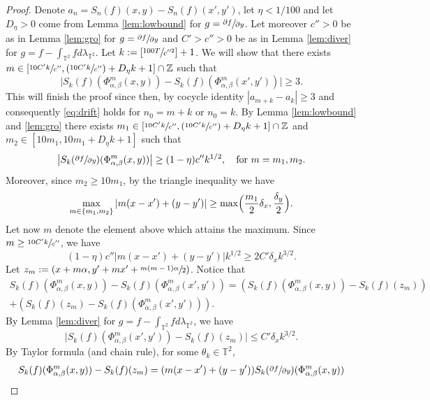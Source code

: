\documentclass[10pt]{amsart}
\newcommand{\Psfrac}[2]{(\sfrac{#1}{#2})}
\theoremstyle{definition}
\theoremstyle{plain}
\newcommand\TT{\mathbb{T}}
\newcommand\ZZ{\mathbb{Z}}
\begin{document}
\begin{proof} Denote $a_n=S_{n}(f)(x,y)-S_{n}(f)(x',y')$, let $\eta<1/100$ and let $D_\eta>0$ come from Lemma \ref{lem:lowbound} for $g=\sfrac{\partial f}{\partial y}$. Let moreover $c''>0$ be as in Lemma \ref{lem:gro} for $g=\sfrac{\partial f}{\partial y}$ and $C'>c'' >0$ be as in Lemma \ref{lem:diver} for $g=f-\int_{\TT^2} f d\lambda_{\TT^2}$.
Let $k:=[\sfrac{100T}{c''^2}]+1$. We will show that there exists $m\in [\sfrac{10C'k}{c''},\Psfrac{10C'k}{c''}+D_\eta k+1]\cap \ZZ$ such that
\begin{equation}\label{eq:cocyid}
\bigl|S_k(f)(\Phi_{\alpha,\beta}^m(x,y))-S_k(f)(\Phi_{\alpha,\beta}^m(x',y'))\bigr|\geq 3.
\end{equation}
This will finish the proof since then, by cocycle identity $|a_{m+k}-a_k|\geq 3$ and consequently \eqref{eq:drift} holds for $n_0=m+k$ or $n_0=k$.
By Lemma \ref{lem:lowbound} and \ref{lem:gro} there exists $m_1\in [\sfrac{10C'k}{c''},\Psfrac{10C'k}{c''}+D_\eta k+1]\cap \ZZ$ and $m_2\in [10m_1,10m_1+D_\eta k+1]$ such
that
\begin{equation}\label{eq:mlarge}
\bigl|S_k(\sfrac{\partial f}{\partial y})(\Phi_{\alpha,\beta}^m(x,y))\bigr|\geq (1-\eta)c'' k^{1/2}, \quad \text {for } m=m_1, m_2.
\end{equation}
Moreover, since $m_2\geq 10m_1$, by the triangle inequality we have
\[
\max_{m\in\{m_1,m_2\}}\vert m(x-x')+(y-y')\vert \geq \max\Bigl(\frac{m_1}{2}\delta_x,\frac{\delta_y}{2}\Bigr).
\]
Let now $m$ denote the element above which attains the maximum. Since
$m\geq \sfrac{10C'k}{c''}$, we have
\begin{equation}\label{eq:qu}
(1-\eta)c''\bigl\vert m(x-x')+(y-y')\bigr\vert k^{1/2}\geq 2C'\delta_x k^{3/2}.
\end{equation}
Let $z_m:=( x+m\alpha, y'+m x'+\sfrac{m(m-1)\alpha}{2})$. Notice that
\begin{multline}\label{mult:split}
S_k(f)(\Phi_{\alpha,\beta}^m(x,y))-S_k(f)(\Phi_{\alpha,\beta}^m(x',y'))=
\left(S_k(f)(\Phi_{\alpha,\beta}^m(x,y))-S_k(f)(z_m)\right)\\
+\left(S_k(f)(z_m)-S_k(f)(\Phi_{\alpha,\beta}^m(x',y'))\right).
\end{multline}
By Lemma \ref{lem:diver} for $g=f-\int_{\TT^2} f d\lambda_{\TT^2}$, we have
\[
\bigl|S_k(f)(\Phi_{\alpha,\beta}^m(x',y'))-S_k(f)(z_m)\bigr|\leq C' \delta_x k^{3/2}.
\]
By Taylor formula (and chain rule), for some $\theta_k\in \TT^2$,
\begin{multline*}
S_k(f)(\Phi_{\alpha,\beta}^m(x,y))-S_k(f)(z_m)=(m(x-x')+(y-y'))S_k(\sfrac{\partial f}{\partial y})(\Phi_{\alpha,\beta}^m(x,y))\\

\end{multline*}
\end{proof}
\end{document}
